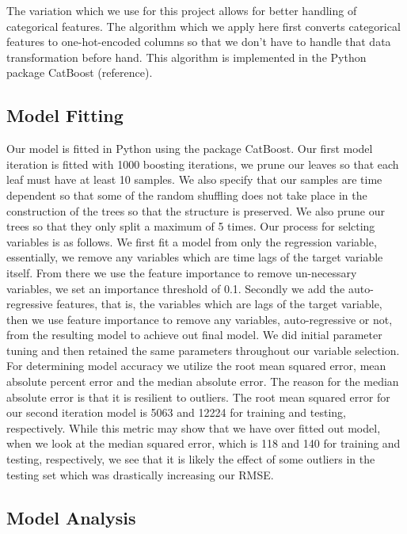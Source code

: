 \documentclass[12pt]{article}
\begin{document}
The variation which we use for this project allows for better handling of categorical features. The algorithm which we apply here first converts categorical features to one-hot-encoded columns so that we don't have to handle that data transformation before hand. This algorithm is implemented in the Python package CatBoost (reference). 

\subsection{\textrm{Model Fitting}}

Our model is fitted in Python using the package CatBoost. Our first model iteration is fitted with 1000 boosting iterations, we prune our leaves so that each leaf must have at least 10 samples. We also specify that our samples are time dependent so that some of the random shuffling does not take place in the construction of the trees so that the structure is preserved. We also prune our trees so that they only split a maximum of 5 times. Our process for selcting variables is as follows. We first fit a model from only the regression variable, essentially, we remove any variables which are time lags of the target variable itself. From there we use the feature importance to remove un-necessary variables, we set an importance threshold of 0.1. Secondly we add the auto-regressive features, that is, the variables which are lags of the target variable, then we use feature importance to remove any variables, auto-regressive or not, from the resulting model to achieve out final model. We did initial parameter tuning and then retained the same parameters throughout our variable selection.  \\

For determining model accuracy we utilize the root mean squared error, mean absolute percent error and the median absolute error. The reason for the median absolute error is that it is resilient to outliers. The root mean squared error for our second iteration model is 5063 and 12224 for training and testing, respectively. While this metric may show that we have over fitted out model, when we look at the median squared error, which is 118 and 140 for training and testing, respectively, we see that it is likely the effect of some outliers in the testing set which was drastically increasing our RMSE. 

\subsection{\textrm{Model Analysis}}
\end{document}
